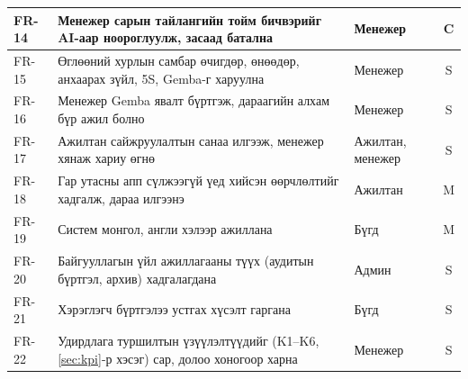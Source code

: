 \begin{longtable}{|p{1.4cm}|p{9.6cm}|p{2.4cm}|c|}
FR-14 & Менежер сарын тайлангийн тойм бичвэрийг AI-аар ноороглуулж, засаад батална & Менежер & C \\ \hline
FR-15 & Өглөөний хурлын самбар өчигдөр, өнөөдөр, анхаарах зүйл, 5S, Gemba-г харуулна & Менежер & S \\ \hline
FR-16 & Менежер Gemba явалт бүртгэж, дараагийн алхам бүр ажил болно & Менежер & S \\ \hline
FR-17 & Ажилтан сайжруулалтын санаа илгээж, менежер хянаж хариу өгнө & Ажилтан, менежер & S \\ \hline
FR-18 & Гар утасны апп сүлжээгүй үед хийсэн өөрчлөлтийг хадгалж, дараа илгээнэ & Ажилтан & M \\ \hline
FR-19 & Систем монгол, англи хэлээр ажиллана & Бүгд & M \\ \hline
FR-20 & Байгууллагын үйл ажиллагааны түүх (аудитын бүртгэл, архив) хадгалагдана & Админ & S \\ \hline
FR-21 & Хэрэглэгч бүртгэлээ устгах хүсэлт гаргана & Бүгд & S \\ \hline
FR-22 & Удирдлага туршилтын үзүүлэлтүүдийг (K1--K6, \ref{sec:kpi}-р хэсэг) сар, долоо хоногоор харна & Менежер & S \\ \hline
\end{longtable}

